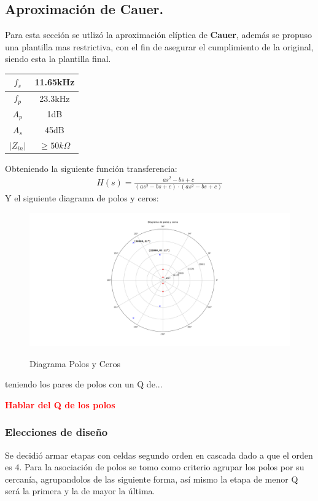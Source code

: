 \subsection{Aproximación de Cauer.}
Para esta sección se utlizó la aproximación elíptica de \textbf{Cauer}, además se propuso una plantilla mas restrictiva, con el fin de asegurar el cumplimiento de la original, siendo esta la plantilla final.
\begin{table}[H]
\centering
\begin{tabular}{|c|c|}
\hline
$f_s$      & 11.65kHz          \\ \hline
$f_p$      & 23.3kHz           \\ \hline
$A_p$      & 1dB               \\ \hline
$A_s$      & 45dB              \\ \hline
$|Z_{in}|$ & $\geq 50k \Omega$ \\ \hline
\end{tabular}
\end{table}
Obteniendo la siguiente función transferencia:
\begin{align}
	H(s)=\frac{as^2-bs+c}{(as^2-bs+c)\cdot (as^2-bs+c)}
\end{align}
Y el siguiente diagrama de polos y ceros:
\begin{figure}[H]
	\centering
	\includegraphics[width=\textwidth]{Imagenes-Ej3/DiagramaPolosYCeros.png}
	\label{fig:stepresponse}
	\caption{Diagrama Polos y Ceros}
\end{figure}

teniendo los pares de polos con un Q de...
\begin{center}
	\huge{\textcolor{red}{\textbf{Hablar del Q de los polos}}}
\end{center}
\subsubsection{Elecciones de diseño}
Se decidió armar etapas con celdas segundo orden en cascada dado a que el orden es 4.
Para la asociación de polos se tomo como criterio agrupar los polos por su cercanía, agrupandolos de las siguiente forma, así mismo la etapa de menor Q será la primera y la de mayor la última.
